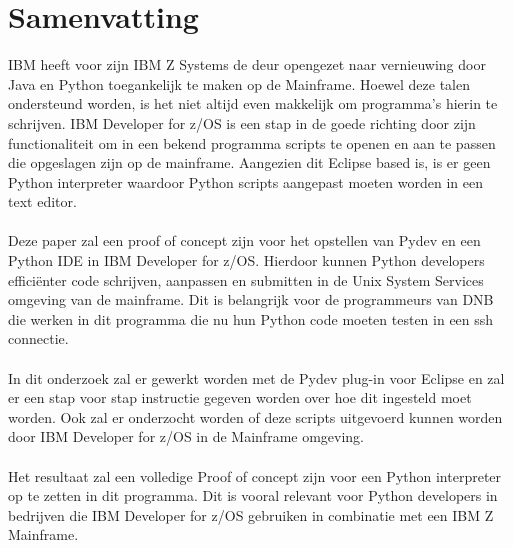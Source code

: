 \chapter*{Samenvatting}
IBM heeft voor zijn IBM Z Systems de deur opengezet naar vernieuwing door Java en Python toegankelijk te maken op de Mainframe. Hoewel deze talen ondersteund worden, is het niet altijd even makkelijk om programma's hierin te schrijven. IBM Developer for z/OS is een stap in de goede richting door zijn functionaliteit om in een bekend programma scripts te openen en aan te passen die opgeslagen zijn op de mainframe. Aangezien dit Eclipse based is, is er geen Python interpreter waardoor Python scripts aangepast moeten worden in een text editor. \\ \\
Deze paper zal een proof of concept zijn voor het opstellen van Pydev en een Python IDE in IBM Developer for z/OS. Hierdoor kunnen Python developers efficiënter code schrijven, aanpassen en submitten in de Unix System Services omgeving van de mainframe. Dit is belangrijk voor de programmeurs van DNB die werken in dit programma die nu hun Python code moeten testen in een ssh connectie. \\ \\
In dit onderzoek zal er gewerkt worden met de Pydev plug-in voor Eclipse en zal er een stap voor stap instructie gegeven worden over hoe dit ingesteld moet worden. Ook zal er onderzocht worden of deze scripts uitgevoerd kunnen worden door IBM Developer for z/OS in de Mainframe omgeving. \\ \\
Het resultaat zal een volledige Proof of concept zijn voor een Python interpreter op te zetten in dit programma. Dit is vooral relevant voor Python developers in bedrijven die IBM Developer for z/OS gebruiken in combinatie met een IBM Z Mainframe. 
